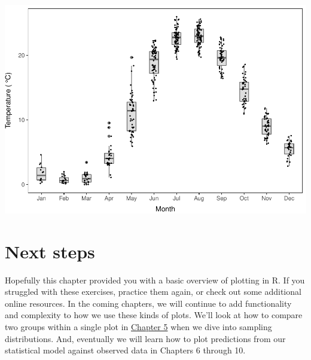 \documentclass[
]{book}
\begin{document}
\includegraphics{worstr_files/figure-latex/unnamed-chunk-114-1.pdf}

\hypertarget{next-steps}{%
\section{Next steps}\label{next-steps}}

Hopefully this chapter provided you with a basic overview of plotting in R. If you struggled with these exercises, practice them again, or check out some additional online resources. In the coming chapters, we will continue to add functionality and complexity to how we use these kinds of plots. We'll look at how to compare two groups within a single plot in \protect\hyperlink{Chapter5}{Chapter 5} when we dive into sampling distributions. And, eventually we will learn how to plot predictions from our statistical model against observed data in Chapters 6 through 10.

  
\end{document}
